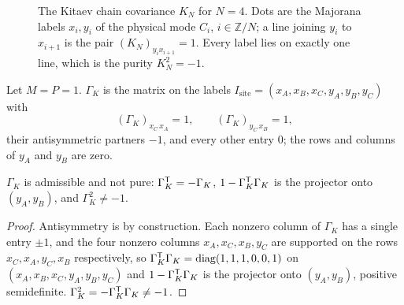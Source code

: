 \begin{figure}[t]
\centering
{}
\caption{The Kitaev chain covariance $K_N$ for $N=4$. Dots are the Majorana labels
$x_i,y_i$ of the physical mode $C_i$, $i\in\mathbb Z/N$; a line joining $y_i$ to $x_{i+1}$ is
the pair $(K_N)_{y_ix_{i+1}}=1$. Every label lies on exactly one line, which is the purity
$K_N^2=-1$.}
\label{fig:kitaev}
\end{figure}

\begin{definition}\label{def:kitaev}
Let $M=P=1$. $\Gamma_K$ is the matrix on the labels $I_{\mathrm{site}}=(x_A,x_B,x_C,y_A,y_B,y_C)$ with
\[
 (\Gamma_K)_{x_C\,x_A}=1,\qquad(\Gamma_K)_{y_C\,x_B}=1,
\]
their antisymmetric partners $-1$, and every other entry $0$; the rows and columns of
$y_A$ and $y_B$ are zero.
\end{definition}

\begin{lemma}\label{lem:kitaev-adm}
$\Gamma_K$ is admissible and not pure: $\Gamma_K^{\mathsf T}=-\Gamma_K$, $1-\Gamma_K^{\mathsf T}\Gamma_K$ is
the projector onto $(y_A,y_B)$, and $\Gamma_K^2\neq-1$.
\end{lemma}
\begin{proof}
Antisymmetry is by construction. Each nonzero column of $\Gamma_K$ has a single entry
$\pm1$, and the four nonzero columns $x_A,x_C,x_B,y_C$ are supported on the rows
$x_C,x_A,y_C,x_B$ respectively, so $\Gamma_K^{\mathsf T}\Gamma_K=\operatorname{diag}(1,1,1,0,0,1)$ on
$(x_A,x_B,x_C,y_A,y_B,y_C)$ and $1-\Gamma_K^{\mathsf T}\Gamma_K$ is the projector onto $(y_A,y_B)$,
positive semidefinite. $\Gamma_K^2=-\Gamma_K^{\mathsf T}\Gamma_K\neq-1$.
\end{proof}

